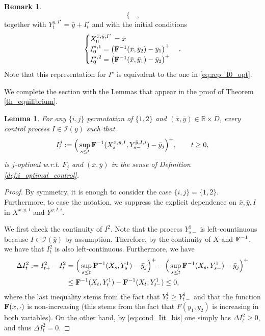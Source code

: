 \documentclass[10pt]{article}
\numberwithin{equation}{section}
\theoremstyle{plain}
\numberwithin{theorem}{section}
\newtheorem{lemma}[theorem]{Lemma}                              %
\theoremstyle{definition}
\newtheorem{remark}[theorem]{Remark}
\def \R {\mathbb{R}}
\newcommand{\<}{\langle}
\renewcommand{\>}{\rangle}
\renewcommand{\(}{\left(}
\renewcommand{\)}{\right)}
\renewcommand{\red}[1]{\textcolor{red}{#1}}
\def \R  {{\mathbb {R}}}
\def \R {{\mathbb {R}}}
\begin{document}
{{{\begin{remark}
\begin{equation}
\begin{cases}
\end{cases},
\end{equation}
together with $Y_{t}^{\bar y,I^{\star}} = \bar y + I^{\star}_t$ and with the initial conditions
\begin{equation}\label{eq:optimal_cont_bis}
\begin{cases}
X^{\bar x,\bar y,I^{\star}}_0 = \bar x\\
I^{\star,1}_0 = \big( {\bf F}^{-1}(\bar x,\bar y_2) - \bar y_1 \big)^+ \\ %
I^{\star,2}_0 = \big( {\bf F}^{-1}(\bar x,\bar y_1) - \bar y_2 \big)^+ 
\end{cases}.
\end{equation}
{Note that this representation for $I^{\star}$ is equivalent to the one in \eqref{eq:rep_I0_opt}.}
\end{remark}

We complete the section with the Lemmas that appear in the proof of Theorem \ref{th_equilibrium}.

\begin{lemma}\label{lem:optimal}
For any $\{ i, j \}$ permutation of $\{ 1,2 \}$
 and $(\bar{x},\bar{y})\in \R\times {D}$, every control process $I\in\mathcal{I}(\bar y)$ such that 
\begin{equation}\label{eq:cond_Iit_bis}
I^j_t := \Big( \sup_{s\leq t} {\bf F}^{-1}(X^{\bar x, \bar y, I}_s , Y^{\bar y, I, i}_{s-}) - \bar y_{j} \Big)^+ , \qquad t\geq 0, 
\end{equation}
is $j$-optimal w.r.t. $F_j$ and $(\bar{x},\bar{y})$ in the sense of Definition \ref{def:i_optimal_control}. 
\end{lemma}
\begin{proof}
By symmetry, it is enough to consider the case $\{ i, j \} = \{ 1,2 \}$. Furthermore, to ease the notation, we suppress the explicit dependence on $\bar x, \bar y, I$ in $X^{\bar x, \bar y, I}$ and $Y^{\bar y, I, i}$.

We first check the continuity of $I^2$. Note that the process $Y^1_{s-}$ is left-countinuous because $I\in \mathcal{I}(\bar y)$ by assumption. Therefore, by %
the continuity of $X$ {and ${\bf F}^{-1}$}, we have that $I^2_t$ is also left-continuous. Furthermore, we have 
\begin{align}%
\Delta I^2_t := I^2_{t+} - I^2_{t} & = \Big( \sup_{s\leq t} {\bf F}^{-1}(X_s , Y^1_{s}) - \bar y_{j} \Big)^+  - \Big( \sup_{s\leq t} {\bf F}^{-1}(X_s , Y^1_{s-}) - \bar y_{j} \Big)^+  \\
&\leq {\bf F}^{-1}(X_t , Y^1_{t}) - {\bf F}^{-1}(X_t , Y^1_{t-}) \leq 0,
\end{align}
where the last inequality stems from the fact that $Y^1_t\geq Y^1_{t-}$ and that the function ${\bf F}(x,\cdot)$ is non-increasing (this stems from the fact that $F(y_1,y_2)$ is increasing in both variables). On the other hand, by \eqref{eq:cond_Iit_bis} one simply has $\Delta I^2_t\geq 0$, and thus $\Delta I^2_t = 0$.


\end{proof}}}}
\end{document}
